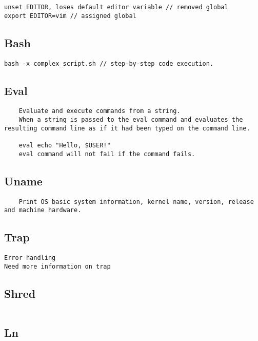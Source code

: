 \begin{verbatim}
unset EDITOR, loses default editor variable // removed global
export EDITOR=vim // assigned global
\end{verbatim}

\subsection{Bash}

\begin{verbatim}
bash -x complex_script.sh // step-by-step code execution. 
\end{verbatim}

\subsection{Eval}

\begin{verbatim}
    Evaluate and execute commands from a string. 
    When a string is passed to the eval command and evaluates the resulting command line as if it had been typed on the command line.

    eval echo "Hello, $USER!"
    eval command will not fail if the command fails.  
\end{verbatim}

\subsection{Uname}

\begin{verbatim}
    Print OS basic system information, kernel name, version, release and machine hardware. 
\end{verbatim}
\subsection{Trap}

\begin{verbatim}
Error handling
Need more information on trap
\end{verbatim}

\subsection{Shred}
\begin{verbatim}
\end{verbatim}

\subsection{Ln}

